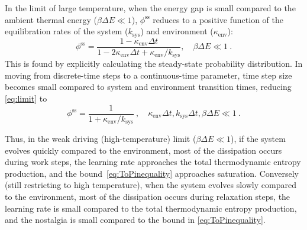 \documentclass[entropy,article,
submit,
moreauthors,pdftex,10pt,a4paper]{mdpi}
\newcommand{\phiSS}{\phi^{\mathrm{ss}}}
\newcommand{\kenv}{\kappa_\mathrm{env}}
\newcommand{\ksys}{k_\mathrm{sys}}
\begin{document}
In the limit of large temperature, when the energy gap is small compared to the ambient thermal energy ($\beta \Delta E \ll 1$), $\phiSS$ reduces to a positive function of the equilibration rates of the system ($\ksys$) and environment ($\kenv$):
\begin{equation}
	\label{eq:limit}
	\phiSS = \frac{1-\kenv\Delta t}{1-2\kenv\Delta t+\kenv/\ksys} , \quad \beta\Delta E \ll 1 \ . 
\end{equation}
This is found by explicitly calculating the steady-state probability distribution.
In moving from discrete-time steps to a continuous-time parameter, 
time step size becomes small compared to system and environment transition times,
reducing \eqref{eq:limit} to
\begin{equation}
	\label{eq:limit_smallprobs}
	\phiSS = \frac{1}{1+\kenv/\ksys} \ ,\quad \kenv\Delta t, \ksys\Delta t, \beta\Delta E \ll 1 \ .
\end{equation}

Thus, in the weak driving (high-temperature) limit ($\beta \Delta E \ll 1$), if the system evolves quickly compared to the environment, most of the dissipation occurs during work steps, the learning rate approaches the total thermodynamic entropy production, and the bound~\eqref{eq:ToPinequality} approaches saturation. 
Conversely (still restricting to high temperature), when the system evolves slowly compared to the environment, most of the dissipation occurs during relaxation steps, the learning rate is small compared to the total thermodynamic entropy production, and the nostalgia is small compared to the bound in \eqref{eq:ToPinequality}.
\end{document}
